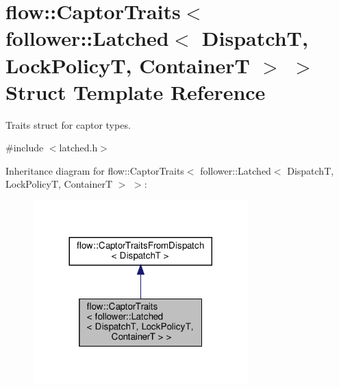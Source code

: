 \hypertarget{structflow_1_1_captor_traits_3_01follower_1_1_latched_3_01_dispatch_t_00_01_lock_policy_t_00_01_container_t_01_4_01_4}{}\section{flow\+:\+:Captor\+Traits$<$ follower\+:\+:Latched$<$ DispatchT, Lock\+PolicyT, ContainerT $>$ $>$ Struct Template Reference}
\label{structflow_1_1_captor_traits_3_01follower_1_1_latched_3_01_dispatch_t_00_01_lock_policy_t_00_01_container_t_01_4_01_4}


Traits struct for captor types.  




{\ttfamily \#include $<$latched.\+h$>$}



Inheritance diagram for flow\+:\+:Captor\+Traits$<$ follower\+:\+:Latched$<$ DispatchT, Lock\+PolicyT, ContainerT $>$ $>$\+:
\nopagebreak
\begin{figure}[H]
\begin{center}
\leavevmode
\includegraphics[width=236pt]{structflow_1_1_captor_traits_3_01follower_1_1_latched_3_01_dispatch_t_00_01_lock_policy_t_00_01_addc158af6f19dd14dbb9f5db2ef3aa0}
\end{center}
\end{figure}


